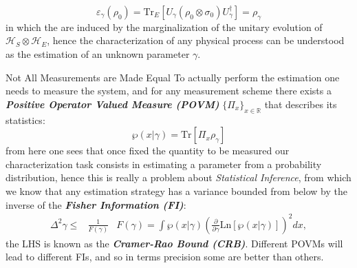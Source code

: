 \documentclass[final]{beamer}
\newlength{\colwidth}
\begin{document}
\begin{frame}[t]
\begin{columns}[t]
\begin{column}{\colwidth}
  
\vspace{-0.2\linewidth}
{\LARGE
  \begin{equation*}
       \varepsilon_{\gamma}\left(\rho_{0}\right)=\mathrm{Tr}_{E}\left[ U_{\gamma}\left( \rho_{0} \otimes \sigma_{0} \right)U_{\gamma}^{\dagger}\right]=\rho_{\gamma}
  \end{equation*}
}
in which the  are induced by the marginalization of the unitary evolution of
$\mathcal{H}_{S}\otimes\mathcal{H}_{E}$, hence the characterization of any physical process can be understood as the estimation of an unknown parameter $\gamma$.
  \begin{block}{Not All Measurements are Made Equal}
    To actually perform the estimation one needs to measure the system, and for any measurement scheme there exists a \textbf{\textit{Positive
      Operator Valued Measure (POVM)}} $\{\Pi_{x}\}_{x \in \mathbb{R}}$ that describes its statistics:
{\LARGE
  \begin{equation*}
     \wp(x | \gamma)= \mathrm{Tr}\left[\Pi_{x} \rho_{\gamma}\right]
  \end{equation*}
}
from here one sees that once fixed the quantity to be measured our characterization task consists in estimating a parameter from a probability
distribution, hence this is really a problem about \textit{Statistical Inference}, from which we know that any estimation strategy has a variance
bounded from below by the inverse of the \textit{\textbf{Fisher Information (FI)}}:
{\Large
  \begin{align*}
    \Delta^{2}\gamma \leq & \frac{1}{F(\gamma)} & F(\gamma) = \int  \wp(x | \gamma) \left(\frac{\partial}{\partial\gamma} \mathrm{Ln}  [\wp(x |\gamma)]\right)^{2} dx,
  \end{align*}
}
the LHS is known as the \textit{\textbf{Cramer-Rao Bound (CRB)}}. Different POVMs will lead to different FIs, and so in terms precision some
are better than others.
\end{block}


\end{column}
\end{columns}
\end{frame}
\end{document}
